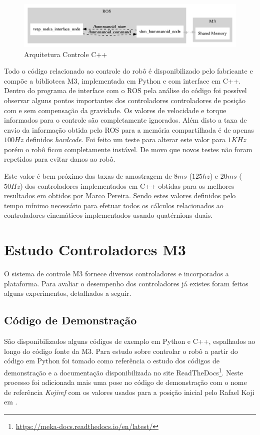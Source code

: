 \begin{figure}[H]
    \centering
    \includegraphics[width=1\linewidth]{figs/shm_arch}
    \caption{Arquitetura Controle C++}
    \label{fig:shm_arch}
\end{figure}

Todo o código relacionado ao controle do robô é disponibilizado pelo fabricante e compõe a biblioteca M3, implementada em Python e com interface em C++. Dentro do programa de interface com o ROS pela análise do código foi possível observar alguns pontos importantes dos controladores controladores de posição com e sem compensação da gravidade. Os valores de velocidade e torque informados para o controle são completamente ignorados. Além disto a taxa de envio da informação obtida pelo ROS para a memória compartilhada é de apenas $100Hz$ definidos \textit{hardcode}. Foi feito um teste para alterar este valor para $1KHz$ porém o robô ficou completamente instável. De movo que novos testes não foram repetidos para evitar danos ao robô.

Este valor é bem próximo das taxas de amostragem de $8 ms$ ($125 hz$) e $20 ms$ ($50 Hz$) dos controladores implementados em C++ obtidas para os melhores resultados em \cite{marcosps2016} obtidos por Marco Pereira. Sendo estes valores definidos pelo tempo mínimo necessário para efetuar todos os cálculos relacionados ao controladores cinemáticos implementados usando quatérnions duais.

\section{Estudo Controladores M3}

O sistema de controle M3 fornece diversos controladores e incorporados a plataforma. Para avaliar o desempenho dos controladores já existes foram feitos alguns experimentos, detalhados a seguir.

\subsection{Código de Demonstração}

São disponibilizados alguns códigos de exemplo em Python e C++, espalhados ao longo do código fonte da M3. Para estudo sobre controlar o robô a partir do código em Python foi tomado como referência o estudo dos códigos de demonstração e a documentação disponibilizada no site ReadTheDocs\footnote{\url{https://meka-docs.readthedocs.io/en/latest/}}. Neste processo foi adicionada mais uma pose no código de demonstração com o nome de referência \textit{Kojiref} com os valores usados para a posição inicial pelo Rafael Koji em \cite{koji2017}.

